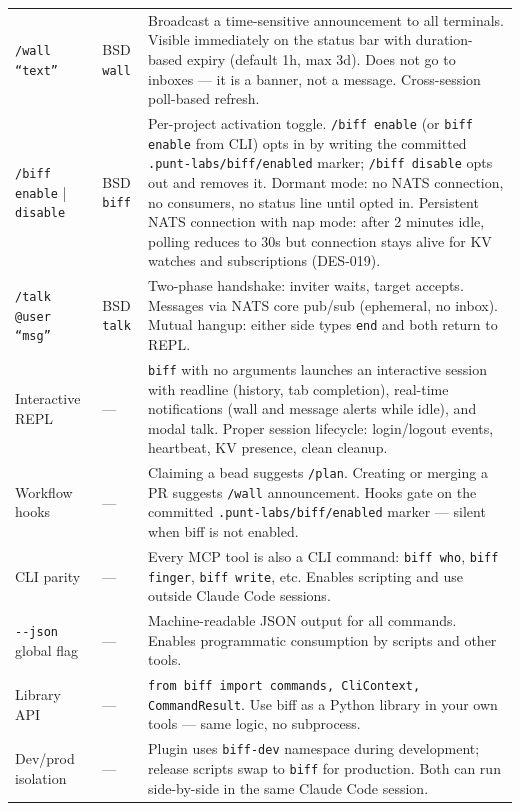 \documentclass[11pt,letterpaper]{article}
\begin{document}
\begin{tabularx}{\textwidth}{@{}l l X@{}}
  \texttt{/wall ``text''} & BSD \texttt{wall} &
  Broadcast a time-sensitive announcement to all terminals. Visible
  immediately on the status bar with duration-based expiry (default 1h,
  max 3d). Does not go to inboxes --- it is a banner, not a message.
  Cross-session poll-based refresh. \\

  \texttt{/biff enable} | \texttt{disable} & BSD \texttt{biff} &
  Per-project activation toggle. \texttt{/biff enable} (or \texttt{biff enable}
  from CLI) opts in by writing the committed \texttt{.punt-labs/biff/enabled}
  marker; \texttt{/biff disable} opts out and removes it.
  Dormant mode: no NATS connection, no consumers, no status line until
  opted in. Persistent NATS connection with nap mode: after 2 minutes idle,
  polling reduces to 30s but connection stays alive for KV watches and
  subscriptions (DES-019). \\

  \texttt{/talk @user ``msg''} & BSD \texttt{talk} &
  Two-phase handshake: inviter waits, target accepts. Messages via
  NATS core pub/sub (ephemeral, no inbox). Mutual hangup: either side
  types \texttt{end} and both return to REPL. \\

  Interactive REPL & --- &
  \texttt{biff} with no arguments launches an interactive session with
  readline (history, tab completion), real-time notifications (wall and
  message alerts while idle), and modal talk. Proper session lifecycle:
  login/logout events, heartbeat, KV presence, clean cleanup. \\

  Workflow hooks & --- &
  Claiming a bead suggests \texttt{/plan}. Creating or merging a PR
  suggests \texttt{/wall} announcement. Hooks gate on the committed
  \texttt{.punt-labs/biff/enabled} marker --- silent when biff is not enabled. \\

  CLI parity & --- &
  Every MCP tool is also a CLI command: \texttt{biff who},
  \texttt{biff finger}, \texttt{biff write}, etc. Enables scripting and
  use outside Claude Code sessions. \\

  \texttt{-{}-json} global flag & --- &
  Machine-readable JSON output for all commands. Enables programmatic
  consumption by scripts and other tools. \\

  Library API & --- &
  \texttt{from biff import commands, CliContext, CommandResult}. Use biff
  as a Python library in your own tools --- same logic, no subprocess. \\

  Dev/prod isolation & --- &
  Plugin uses \texttt{biff-dev} namespace during development; release
  scripts swap to \texttt{biff} for production. Both can run side-by-side
  in the same Claude Code session. \\

  \bottomrule
\end{tabularx}
\end{document}

